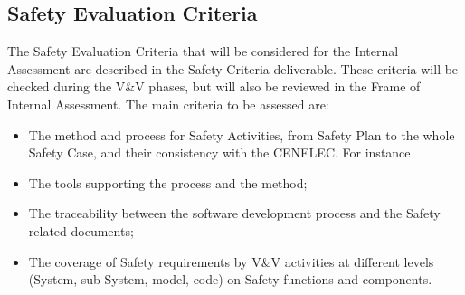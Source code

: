 \documentclass{template/openetcs_article}
\begin{document}
\subsection{Safety Evaluation Criteria}
The Safety Evaluation Criteria that will be considered for the Internal Assessment are described in the Safety Criteria deliverable. These criteria will be checked during the V\&V phases, but will also be reviewed in the Frame of Internal Assessment.
The main criteria to be assessed are:
\begin{itemize}
\item The method and process for Safety Activities, from Safety Plan to the whole Safety Case, and their consistency with the CENELEC. For instance
\item The tools supporting the process and the method;
\item The traceability between the software development process and the Safety related documents;
\item The coverage of Safety requirements by V\&V activities at different levels (System,  sub-System, model, code) on Safety functions and components.
\end{itemize}
\end{document}
